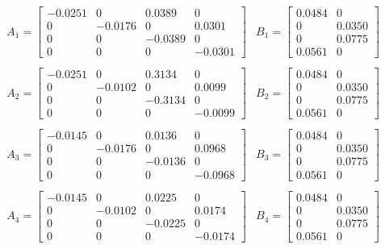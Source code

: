 \begin{align} %
	& A_1 =
	\begin{bmatrix}
	   -0.0251 &       0 &   0.0389  &      0 \\
			0  & -0.0176 &        0  &  0.0301 \\
			0  &       0 &  -0.0389  &       0 \\
			0  &       0 &        0  & -0.0301
	\end{bmatrix}
	& B_1 =
	\begin{bmatrix}
	    0.0484 &       0 \\
			0  &  0.0350 \\
			0  &  0.0775 \\
		0.0561 &       0
	\end{bmatrix} \nonumber \\ \nonumber \\
	& A_2 =
	\begin{bmatrix}
	   -0.0251 &       0 &   0.3134  &       0 \\
			0  & -0.0102 &        0  &  0.0099 \\
			0  &       0 &  -0.3134  &       0 \\
			0  &       0 &        0  & -0.0099
	\end{bmatrix}
	& B_2 =
	\begin{bmatrix}
	    0.0484 &       0 \\
			0  &  0.0350 \\
			0  &  0.0775 \\
		0.0561 &       0
	\end{bmatrix} \nonumber \\ \nonumber \\
	& A_3 =
	\begin{bmatrix}
	   -0.0145 &       0 &   0.0136  &       0 \\
			0  & -0.0176 &        0  &  0.0968 \\
			0  &       0 &  -0.0136  &       0 \\
			0  &       0 &        0  & -0.0968
	\end{bmatrix}
	& B_3 =
	\begin{bmatrix}
	    0.0484 &       0 \\
			0  &  0.0350 \\
			0  &  0.0775 \\
		0.0561 &       0
	\end{bmatrix} \nonumber \\ \nonumber \\
	& A_4 =
	\begin{bmatrix}
	   -0.0145 &       0 &   0.0225  &      0 \\
			0  & -0.0102 &        0  &  0.0174 \\
			0  &       0 &  -0.0225  &       0 \\
			0  &       0 &        0  & -0.0174
	\end{bmatrix}
	& B_4 =
	\begin{bmatrix}
	    0.0484 &       0 \\
			0  &  0.0350 \\
			0  &  0.0775 \\
		0.0561 &       0
	\end{bmatrix}
\end{align}
